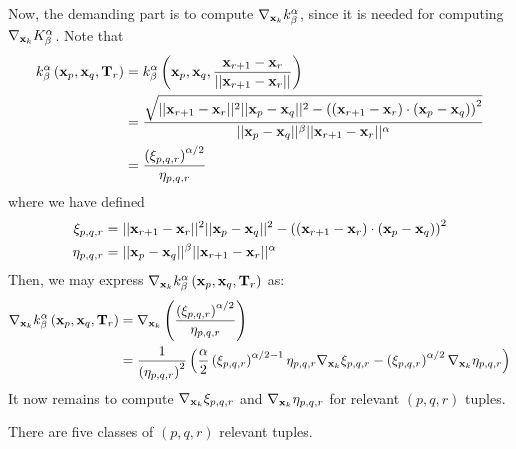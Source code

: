 \documentclass[../dissertation.tex]{subfiles}
\begin{document}
Now, the demanding part is to compute $\nabla_{\mathbf{x}_k} k_{\beta}^{\alpha}$, since it is needed for computing $\nabla_{\mathbf{x}_k} K_{\beta}^{\alpha}$.
Note that
\begin{align}
    k_{\beta}^{\alpha} \left( \mathbf{x}_p, \mathbf{x}_q, \mathbf{T}_r \right) &= k_{\beta}^{\alpha} \left( \mathbf{x}_p, \mathbf{x}_q, \frac{\mathbf{x}_{r+1} - \mathbf{x}_r}{\lvert \lvert \mathbf{x}_{r+1} - \mathbf{x}_r \rvert \rvert} \right) \nonumber \\
    &= \frac{\sqrt{\lvert \lvert \mathbf{x}_{r+1} - \mathbf{x}_r \rvert \rvert^2 \lvert \lvert \mathbf{x}_p - \mathbf{x}_q \rvert \rvert^2 - \left( \left( \mathbf{x}_{r+1} - \mathbf{x}_r \right) \cdot \left( \mathbf{x}_p - \mathbf{x}_q \right) \right)^2}}{\lvert \lvert \mathbf{x}_p - \mathbf{x}_q \rvert \rvert^{\beta} \lvert \lvert \mathbf{x}_{r+1} - \mathbf{x}_r \rvert \rvert^{\alpha}} \nonumber \\
    &= \frac{\left( \xi_{p,q,r} \right)^{\alpha/2}}{\eta_{p,q,r}}
    \label{equ: Exact Gradient 3}
\end{align}
where we have defined
\begin{align*}
    \xi_{p,q,r} &= \lvert \lvert \mathbf{x}_{r+1} - \mathbf{x}_r \rvert \rvert^2 \lvert \lvert \mathbf{x}_p - \mathbf{x}_q \rvert \rvert^2 - \left( \left( \mathbf{x}_{r+1} - \mathbf{x}_r \right) \cdot \left( \mathbf{x}_p - \mathbf{x}_q \right) \right)^2 \\
    \eta_{p,q,r} &= \lvert \lvert \mathbf{x}_p - \mathbf{x}_q \rvert \rvert^{\beta} \lvert \lvert \mathbf{x}_{r+1} - \mathbf{x}_r \rvert \rvert^{\alpha}
\end{align*}
Then, we may express $\nabla_{\mathbf{x}_k} k_{\beta}^{\alpha} \left( \mathbf{x}_p, \mathbf{x}_q, \mathbf{T}_r \right)$ as:
\begin{align}
    \nabla_{\mathbf{x}_k} k_{\beta}^{\alpha} \left( \mathbf{x}_p, \mathbf{x}_q, \mathbf{T}_r \right)
    &= \nabla_{\mathbf{x}_k} \left(\frac{\left( \xi_{p,q,r} \right)^{\alpha/2}}{\eta_{p,q,r}} \right) \nonumber \\
    &=
    \frac{1}{\left( \eta_{p,q,r} \right)^2} \left( \frac{\alpha}{2} \left( \xi_{p,q,r} \right)^{\alpha/2-1} \eta_{p,q,r} \nabla_{\mathbf{x}_k} \xi_{p,q,r} - \left( \xi_{p,q,r} \right)^{\alpha/2} \nabla_{\mathbf{x}_k} \eta_{p,q,r} \right)
    \label{equ: Exact Gradient 4}
\end{align}
It now remains to compute $\nabla_{\mathbf{x}_k} \xi_{p,q,r}$ and $\nabla_{\mathbf{x}_k} \eta_{p,q,r}$ for relevant $(p,q,r)$ tuples.

There are five classes of $(p,q,r)$ relevant tuples.
\end{document}
